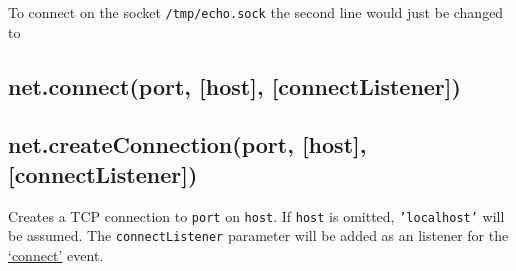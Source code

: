 \begin{Shaded}
\begin{Highlighting}[]
 \NormalTok{);}
 \NormalTok{(\{}\NormalTok{: }\NormalTok{\},}
    \NormalTok{() \{ }
  \NormalTok{(}\NormalTok{);}
  \NormalTok{(}\NormalTok{);}
\NormalTok{\});}
\NormalTok{(}\NormalTok{, }
  \NormalTok{(}\NormalTok{());}
  \NormalTok{();}
\NormalTok{\});}
\NormalTok{(}\NormalTok{, }\NormalTok{() \{}
  \NormalTok{(}\NormalTok{);}
\NormalTok{\});}
\end{Highlighting}
\end{Shaded}

To connect on the socket \texttt{/tmp/echo.sock} the second line would
just be changed to

\begin{Shaded}
\begin{Highlighting}[]
 \NormalTok{(\{}\NormalTok{: }\NormalTok{\},}
\end{Highlighting}
\end{Shaded}

\subsection{net.connect(port, {[}host{]}, {[}connectListener{]})}

\subsection{net.createConnection(port, {[}host{]},
{[}connectListener{]})}

Creates a TCP connection to \texttt{port} on \texttt{host}. If
\texttt{host} is omitted, \texttt{'localhost'} will be assumed. The
\texttt{connectListener} parameter will be added as an listener for the
\hyperref[net\_event\_connect]{`connect'} event.

